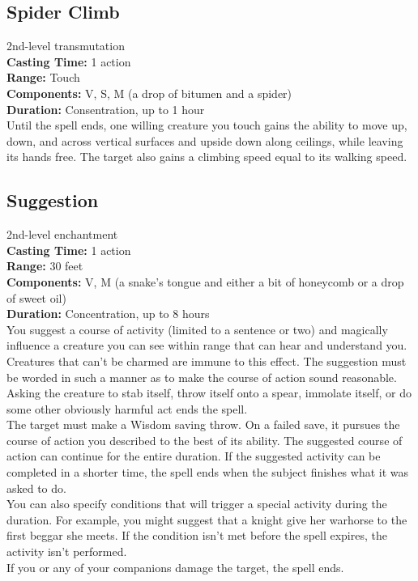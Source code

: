 \documentclass[11pt, A4paper, english]{article}
\begin{document}
		\subsection{Spider Climb}
2nd-level transmutation \\
\textbf{Casting Time:} 1 action \\
\textbf{Range:} Touch \\
\textbf{Components:} V, S, M (a drop of bitumen and a spider) \\
\textbf{Duration:} Consentration, up to 1 hour \\
Until the spell ends, one willing creature you touch gains the ability to move up, down, and across vertical surfaces and upside down along ceilings, while leaving its hands free. The target also gains a climbing speed equal to its walking speed.

		\subsection{Suggestion}
2nd-level enchantment \\
\textbf{Casting Time:} 1 action \\
\textbf{Range:} 30 feet \\
\textbf{Components:} V, M (a snake’s tongue and either a bit of honeycomb or a drop of sweet oil) \\
\textbf{Duration:} Concentration, up to 8 hours \\
You suggest a course of activity (limited to a sentence or two) and magically influence a creature you can see within range that can hear and understand you. Creatures that can’t be charmed are immune to this effect. The suggestion must be worded in such a manner as to make the course of action sound reasonable. Asking the creature to stab itself, throw itself onto a spear, immolate itself, or do some other obviously harmful act ends the spell. \\
The target must make a Wisdom saving throw. On a failed save, it pursues the course of action you described to the best of its ability. The suggested course of action can continue for the entire duration. If the suggested activity can be completed in a shorter time, the spell ends when the subject finishes what it was asked to do. \\
You can also specify conditions that will trigger a special activity during the duration. For example, you might suggest that a knight give her warhorse to the first beggar she meets. If the condition isn’t met before the spell expires, the activity isn’t performed. \\
If you or any of your companions damage the target, the spell ends.
\end{document}
